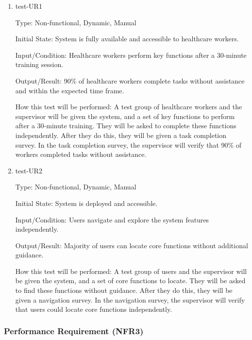 \documentclass[12pt, titlepage]{article}
\begin{document}
\begin{enumerate}
    \item{test-UR1} \label{test-UR1}
    
    Type: Non-functional, Dynamic, Manual
    
    Initial State: System is fully available and accessible to healthcare workers.
    
    Input/Condition: Healthcare workers perform key functions after a 30-minute training session.
    
    Output/Result: 90\% of healthcare workers complete tasks without assistance and within the expected time frame.
    
    How this test will be performed: A test group of healthcare workers and the supervisor will be given the system, and a set of key functions to perform after a 30-minute training. They will be asked to complete these functions independently. After they do this, they will be given a task completion survey. In the task completion survey, the supervisor will verify that 90\% of workers completed tasks without assistance.

    \item{test-UR2} \label{test-UR2}
    
    Type: Non-functional, Dynamic, Manual
    
    Initial State: System is deployed and accessible.
    
    Input/Condition: Users navigate and explore the system features independently.
    
    Output/Result: Majority of users can locate core functions without additional guidance.
    
    How this test will be performed: A test group of users and the supervisor will be given the system, and a set of core functions to locate. They will be asked to find these functions without guidance. After they do this, they will be given a navigation survey. In the navigation survey, the supervisor will verify that users could locate core functions independently.
\end{enumerate}

\subsubsection{Performance Requirement (NFR3)} \label{section:4.2.3}
\end{document}
